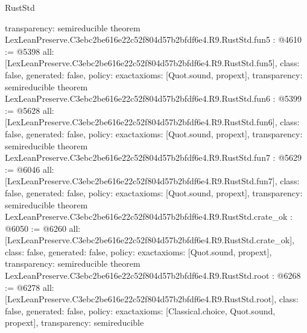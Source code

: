 \begin{lexlean}{RustStd}
\begin{coremodule}
{  transparency: semireducible
}
theorem LexLeanPreserve.C3ebc2be616e22c52f804d57b2bfdf6e4.R9.RustStd.fun5 : @4610 := @5398 {
  all: [LexLeanPreserve.C3ebc2be616e22c52f804d57b2bfdf6e4.R9.RustStd.fun5],
  class: false,
  generated: false,
  policy: exact{axioms: [Quot.sound, propext]},
  transparency: semireducible
}
theorem LexLeanPreserve.C3ebc2be616e22c52f804d57b2bfdf6e4.R9.RustStd.fun6 : @5399 := @5628 {
  all: [LexLeanPreserve.C3ebc2be616e22c52f804d57b2bfdf6e4.R9.RustStd.fun6],
  class: false,
  generated: false,
  policy: exact{axioms: [Quot.sound, propext]},
  transparency: semireducible
}
theorem LexLeanPreserve.C3ebc2be616e22c52f804d57b2bfdf6e4.R9.RustStd.fun7 : @5629 := @6046 {
  all: [LexLeanPreserve.C3ebc2be616e22c52f804d57b2bfdf6e4.R9.RustStd.fun7],
  class: false,
  generated: false,
  policy: exact{axioms: [Quot.sound, propext]},
  transparency: semireducible
}
theorem LexLeanPreserve.C3ebc2be616e22c52f804d57b2bfdf6e4.R9.RustStd.crate_ok : @6050 := @6260 {
  all: [LexLeanPreserve.C3ebc2be616e22c52f804d57b2bfdf6e4.R9.RustStd.crate_ok],
  class: false,
  generated: false,
  policy: exact{axioms: [Quot.sound, propext]},
  transparency: semireducible
}
theorem LexLeanPreserve.C3ebc2be616e22c52f804d57b2bfdf6e4.R9.RustStd.root : @6268 := @6278 {
  all: [LexLeanPreserve.C3ebc2be616e22c52f804d57b2bfdf6e4.R9.RustStd.root],
  class: false,
  generated: false,
  policy: exact{axioms: [Classical.choice, Quot.sound, propext]},
  transparency: semireducible
}


\end{coremodule}
\end{lexlean}
